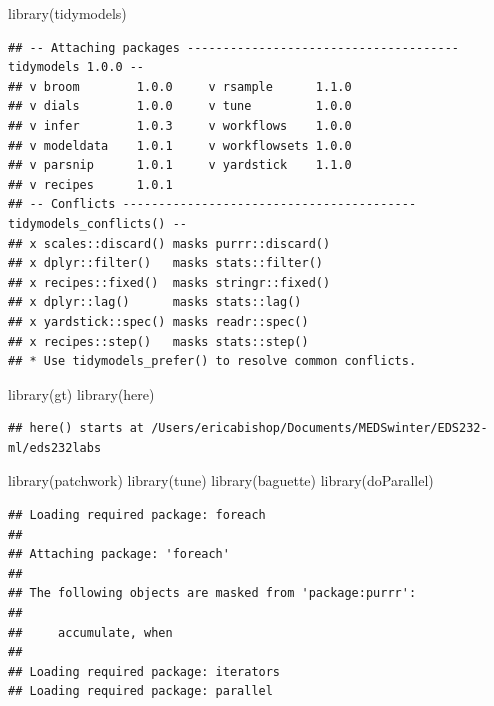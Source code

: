 \documentclass[
]{article}
\newenvironment{Shaded}{\begin{snugshade}}{\end{snugshade}}
\newcommand{\FunctionTok}[1]{\textcolor[rgb]{0.00,0.00,0.00}{#1}}
\newcommand{\NormalTok}[1]{#1}
\begin{document}
\begin{Shaded}
\begin{Highlighting}[]
\FunctionTok{library}\NormalTok{(tidymodels)}
\end{Highlighting}
\end{Shaded}

\begin{verbatim}
## -- Attaching packages -------------------------------------- tidymodels 1.0.0 --
## v broom        1.0.0     v rsample      1.1.0
## v dials        1.0.0     v tune         1.0.0
## v infer        1.0.3     v workflows    1.0.0
## v modeldata    1.0.1     v workflowsets 1.0.0
## v parsnip      1.0.1     v yardstick    1.1.0
## v recipes      1.0.1     
## -- Conflicts ----------------------------------------- tidymodels_conflicts() --
## x scales::discard() masks purrr::discard()
## x dplyr::filter()   masks stats::filter()
## x recipes::fixed()  masks stringr::fixed()
## x dplyr::lag()      masks stats::lag()
## x yardstick::spec() masks readr::spec()
## x recipes::step()   masks stats::step()
## * Use tidymodels_prefer() to resolve common conflicts.
\end{verbatim}

\begin{Shaded}
\begin{Highlighting}[]
\FunctionTok{library}\NormalTok{(gt)}
\FunctionTok{library}\NormalTok{(here)}
\end{Highlighting}
\end{Shaded}

\begin{verbatim}
## here() starts at /Users/ericabishop/Documents/MEDSwinter/EDS232-ml/eds232labs
\end{verbatim}

\begin{Shaded}
\begin{Highlighting}[]
\FunctionTok{library}\NormalTok{(patchwork)}
\FunctionTok{library}\NormalTok{(tune)}
\FunctionTok{library}\NormalTok{(baguette)}
\FunctionTok{library}\NormalTok{(doParallel)}
\end{Highlighting}
\end{Shaded}

\begin{verbatim}
## Loading required package: foreach
## 
## Attaching package: 'foreach'
## 
## The following objects are masked from 'package:purrr':
## 
##     accumulate, when
## 
## Loading required package: iterators
## Loading required package: parallel
\end{verbatim}
\end{document}
